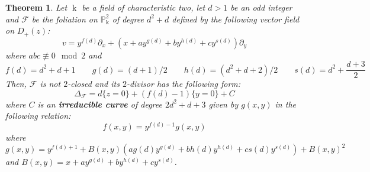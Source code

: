\documentclass[reqno,oneside,11pt]{amsart}
\newtheorem{thm}{Theorem}[section]
\theoremstyle{definition}
\DeclareMathOperator{\field}{k}
\begin{document}
\begin{thm}\label{thm:claudia2} Let $\field$ be a field of characteristic two, let $d>1$ be an odd integer and $\mathcal{F}$ be the foliation on $\mathbb{P}_{\field}^{2}$ of degree $d^2+d$ defined by the following vector field on $D_{+}(z)$:  
    $$
        v = y^{f(d)}\partial_x+(x+ay^{g(d)}+by^{h(d)}+cy^{s(d)})\partial_y
    $$      
where $abc \not\equiv 0 \mod 2$ and
$$f(d) = d^2+d+1 \qquad g(d) = (d+1)/2 \qquad h(d) = (d^2+d+2)/2 \qquad s(d) = d^2+\frac{d+3}{2}$$
Then, $\mathcal{F}$ is not $2$-closed and its $2$-divisor has the following form:
$$
    \Delta_{\mathcal{F}} = d\{z=0\}+(f(d)-1)\{y=0\}+C
$$
where $C$ is an \textbf{irreducible curve} of degree $2d^2 + d + 3$ given by $g(x,y)$ in the following relation:
$$
       f(x, y) =  y^{f(d)-1}g(x,y)
$$
where 
$$
    g(x,y) = y^{f(d)+1}+B(x,y)(ag(d)y^{g(d)}+bh(d)y^{h(d)}+cs(d)y^{s(d)})+B(x,y)^{2}
$$
and $B(x,y) = x+ay^{g(d)}+by^{h(d)}+cy^{s(d)}$.
\end{thm}
\end{document}
